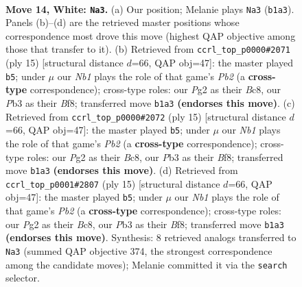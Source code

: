 \documentclass[11pt]{article}
\begin{document}
\clearpage

\begin{figure}[p]\centering
\begin{subfigure}{0.46\textwidth}\centering
\resizebox{\linewidth}{!}{%
\newchessgame
\chessboard[
  setfen={r1b1kbnr/4q1p1/8/p1ppPp1p/5P2/1P6/P3Q1PP/RNB2BKR w kq - 0 14},
  showmover=false,
  pgfstyle=straightmove, color=movearrow, markmove={b1-a3}
]}
\caption{}
\end{subfigure}\hfill
\begin{subfigure}{0.46\textwidth}\centering
\resizebox{\linewidth}{!}{%
\newchessgame
\chessboard[
  setfen={r1b1kbnr/1pqp1ppp/p3p3/8/3QPP2/2N1B3/PPP3PP/R3KB1R b KQkq - 1 8},
  showmover=false,
  pgfstyle=straightmove, color=movearrow, markmove={b7-b5}
]}
\caption{}
\end{subfigure}
\\[4pt]
\begin{subfigure}{0.46\textwidth}\centering
\resizebox{\linewidth}{!}{%
\newchessgame
\chessboard[
  setfen={r1b1kbnr/1pqp1ppp/p3p3/8/3QPP2/2N1B3/PPP3PP/R3KB1R b KQkq - 1 8},
  showmover=false,
  pgfstyle=straightmove, color=movearrow, markmove={b7-b5}
]}
\caption{}
\end{subfigure}\hfill
\begin{subfigure}{0.46\textwidth}\centering
\resizebox{\linewidth}{!}{%
\newchessgame
\chessboard[
  setfen={r1b1kbnr/1pqp1ppp/p3p3/8/3QPP2/2N1B3/PPP3PP/R3KB1R b KQkq - 1 8},
  showmover=false,
  pgfstyle=straightmove, color=movearrow, markmove={b7-b5}
]}
\caption{}
\end{subfigure}
\caption{\textbf{Move 14, White: \texttt{Na3}.} (a) Our position; Melanie plays \texttt{Na3} (\texttt{b1a3}). Panels (b)--(d) are the retrieved master positions whose correspondence most drove this move (highest QAP objective among those that transfer to it). (b) Retrieved from \texttt{ccrl\_top\_p0000\#2071} (ply 15) [structural distance $d$=66, QAP obj=47]: the master played \texttt{b5}; under $\mu$ our \emph{Nb1} plays the role of that game's \emph{Pb2} (a \textbf{cross-type} correspondence); cross-type roles: our \emph{P}g2 as their \emph{B}c8, our \emph{P}b3 as their \emph{B}f8; transferred move \texttt{b1a3} \textbf{(endorses this move)}. (c) Retrieved from \texttt{ccrl\_top\_p0000\#2072} (ply 15) [structural distance $d$=66, QAP obj=47]: the master played \texttt{b5}; under $\mu$ our \emph{Nb1} plays the role of that game's \emph{Pb2} (a \textbf{cross-type} correspondence); cross-type roles: our \emph{P}g2 as their \emph{B}c8, our \emph{P}b3 as their \emph{B}f8; transferred move \texttt{b1a3} \textbf{(endorses this move)}. (d) Retrieved from \texttt{ccrl\_top\_p0001\#2807} (ply 15) [structural distance $d$=66, QAP obj=47]: the master played \texttt{b5}; under $\mu$ our \emph{Nb1} plays the role of that game's \emph{Pb2} (a \textbf{cross-type} correspondence); cross-type roles: our \emph{P}g2 as their \emph{B}c8, our \emph{P}b3 as their \emph{B}f8; transferred move \texttt{b1a3} \textbf{(endorses this move)}. Synthesis: 8 retrieved analogs transferred to \texttt{Na3} (summed QAP objective 374, the strongest correspondence among the candidate moves); Melanie committed it via the \texttt{search} selector.}
\label{fig:thought-m26}
\end{figure}
\end{document}
